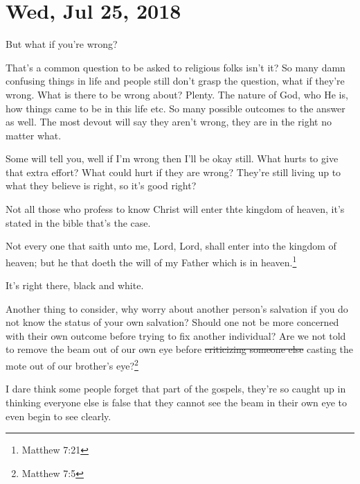 \section{Wed, Jul 25, 2018}

\centerline{But what if you're wrong?}

That's a common question to be asked to religious folks isn't it? So many damn
confusing things in life and people still don't grasp the question, what if they're
wrong. What is there to be wrong about? Plenty. The nature of God, who He is, how
things came to be in this life etc. So many possible outcomes to the answer as well.
The most devout will say they aren't wrong, they are in the right no matter what.

Some will tell you, well if I'm wrong then I'll be okay still. What hurts to give
that extra effort? What could hurt if they are wrong? They're still living up to what
they believe is right, so it's good right?

Not all those who profess to know Christ will enter thte kingdom of heaven, it's
stated in the bible that's the case.

\begin{displayquote}
Not every one that saith unto me, Lord, Lord, shall enter into the kingdom of heaven;
but he that doeth the will of my Father which is in heaven.\footnote{Matthew 7:21}
\end{displayquote}

It's right there, black and white.

Another thing to consider, why worry about another person's salvation if you do not
know the status of your own salvation? Should one not be more concerned with their
own outcome before trying to fix another individual? Are we not told to remove the
beam out of our own eye before \st{criticizing someone else} casting the mote out of 
our brother's eye?\footnote{Matthew 7:5}

I dare think some people forget that part of the gospels, they're so caught up in
thinking everyone else is false that they cannot see the beam in their own eye to
even begin to see clearly.